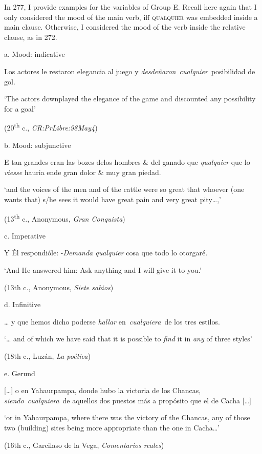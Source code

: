 In 277, I provide examples for the variables of Group E. Recall here again that I only considered the mood of the main verb, iff \textsc{qualquier} was embedded inside a main clause. Otherwise, I considered the mood of the verb inside the relative clause, as in 272.

  a.  Mood: indicative

    Los actores le restaron elegancia al juego y \textit{desdeñaron~cualquier}~posibilidad de gol. 

    ‘The actors downplayed the elegance of the game and discounted any possibility for a goal’

    (20\textsuperscript{th} c., \textit{CR:PrLibre:98May4})

  b.  Mood: subjunctive

    E tan grandes eran las bozes delos hombres \& del ganado que \textit{qualquier} que lo \textit{viesse} hauria ende gran dolor \& muy gran piedad. 

    ‘and the voices of the men and of the cattle were so great that whoever (one wants that) s/he sees it would have great pain and very great pity…,’

    (13\textsuperscript{th} c., Anonymous, \textit{Gran Conquista})

  c.  Imperative

    Y Él respondióle: -\textit{Demanda qualquier} cosa que todo lo otorgaré. 

    ‘And He answered him: Ask anything and I will give it to you.’

    (13th c., Anonymous, \textit{Siete sabios})

  d.  Infinitive

    … y que hemos dicho poderse \textit{hallar} en~\textit{cualquiera}~de los tres estilos. 

    ‘… and of which we have said that it is possible to \textit{find} it in \textit{any} of three styles’

    (18th c., Luzán, \textit{La poética})

  e.  Gerund

    […] o en Yahaurpampa, donde hubo la victoria de los Chancas, \textit{siendo~cualquiera}~de aquellos dos puestos más a propósito que el de Cacha […] 

    ‘or in Yahaurpampa, where there was the victory of the Chancas, any of those two (building) sites being more appropriate than the one in Cacha…’

    (16th c., Garcilaso de la Vega, \textit{Comentarios reales})

